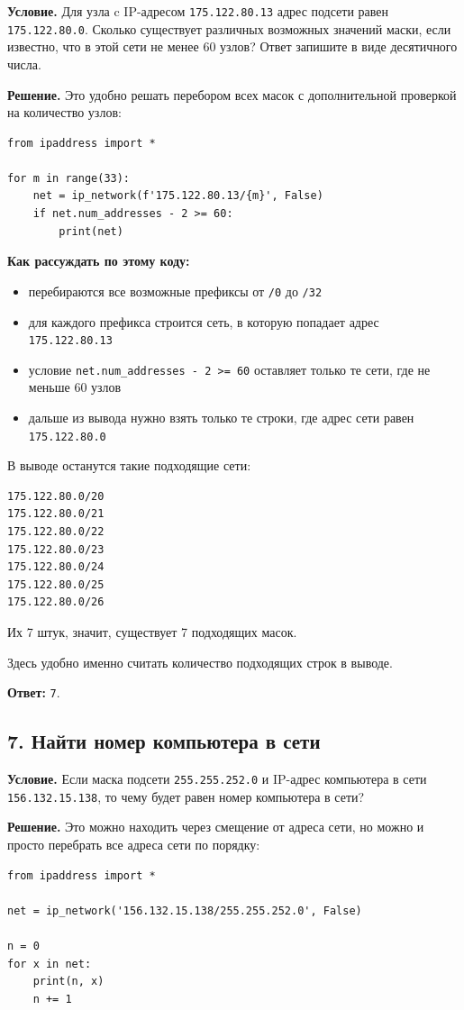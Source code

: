 \documentclass[11pt]{article}
\begin{document}
\textbf{Условие.} Для узла c IP-адресом \texttt{175.122.80.13} адрес подсети равен \texttt{175.122.80.0}. Сколько существует различных возможных значений маски, если известно, что в этой сети не менее 60 узлов? Ответ запишите в виде десятичного числа.

\textbf{Решение.} Это удобно решать перебором всех масок с дополнительной проверкой на количество узлов:
\begin{verbatim}
from ipaddress import *

for m in range(33):
    net = ip_network(f'175.122.80.13/{m}', False)
    if net.num_addresses - 2 >= 60:
        print(net)
\end{verbatim}

\textbf{Как рассуждать по этому коду:}
\begin{itemize}
  \item перебираются все возможные префиксы от \texttt{/0} до \texttt{/32}
  \item для каждого префикса строится сеть, в которую попадает адрес \texttt{175.122.80.13}
  \item условие \texttt{net.num\_addresses - 2 >= 60} оставляет только те сети, где не меньше 60 узлов
  \item дальше из вывода нужно взять только те строки, где адрес сети равен \texttt{175.122.80.0}
\end{itemize}

В выводе останутся такие подходящие сети:
\begin{verbatim}
175.122.80.0/20
175.122.80.0/21
175.122.80.0/22
175.122.80.0/23
175.122.80.0/24
175.122.80.0/25
175.122.80.0/26
\end{verbatim}

Их 7 штук, значит, существует 7 подходящих масок.

Здесь удобно именно считать количество подходящих строк в выводе.

\textbf{Ответ:} \texttt{7}.

\subsection*{7. Найти номер компьютера в сети}

\textbf{Условие.} Если маска подсети \texttt{255.255.252.0} и IP-адрес компьютера в сети \texttt{156.132.15.138}, то чему будет равен номер компьютера в сети?

\textbf{Решение.} Это можно находить через смещение от адреса сети, но можно и просто перебрать все адреса сети по порядку:
\begin{verbatim}
from ipaddress import *

net = ip_network('156.132.15.138/255.255.252.0', False)

n = 0
for x in net:
    print(n, x)
    n += 1
\end{verbatim}
\end{document}
